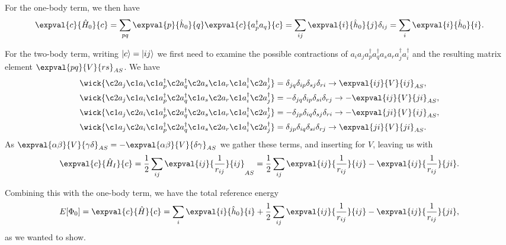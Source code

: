 For the one-body term, we then have
\begin{equation}
    \expval{c}{\hat{H}_0}{c} = \sum_{pq} \expval{p}{\hat{h}_0}{q} \expval{c}{a_p^\dagger a_q}{c} = \sum_{ij} \expval{i}{\hat{h}_0}{j} \delta_{ij} = \sum_{i} \expval{i}{\hat{h}_0}{i}.
\end{equation}

For the two-body term, writing $\lvert c\rangle = \lvert i j\rangle$ we first need to examine the possible contractions of $ a_i a_j a_p^\dagger a_q^\dagger a_s a_r a_j^\dagger a_i^\dagger$ and the resulting matrix element $\expval{pq}{V}{rs}_{AS}$.
We have
\begin{align*}
    \wick{
        \c2 a_j
        \c1 a_i
        \c1 a_p^\dagger
        \c2 a_q^\dagger
        \c2 a_s
        \c1 a_r
        \c1 a_i^\dagger
        \c2 a_j^\dagger
    } &= \delta_{jq} \delta_{ip} \delta_{sj} \delta_{ri} \to \expval{ij}{V}{ij}_{AS}, \\
    \wick{
        \c2 a_j
        \c1 a_i
        \c1 a_p^\dagger
        \c2 a_q^\dagger
        \c1 a_s
        \c2 a_r
        \c1 a_i^\dagger
        \c2 a_j^\dagger
    } &= -\delta_{jq} \delta_{ip} \delta_{si} \delta_{rj} \to -\expval{ij}{V}{ji}_{AS}, \\
    \wick{
        \c1 a_j
        \c2 a_i
        \c1 a_p^\dagger
        \c2 a_q^\dagger
        \c2 a_s
        \c1 a_r
        \c1 a_i^\dagger
        \c2 a_j^\dagger
    } &= -\delta_{jp} \delta_{iq} \delta_{sj} \delta_{ri} \to -\expval{ji}{V}{ij}_{AS}, \\
    \wick{
        \c1 a_j
        \c2 a_i
        \c1 a_p^\dagger
        \c2 a_q^\dagger
        \c1 a_s
        \c2 a_r
        \c1 a_i^\dagger
        \c2 a_j^\dagger
    } &= \delta_{jp} \delta_{iq} \delta_{si} \delta_{rj} \to \expval{ji}{V}{ji}_{AS}.
\end{align*}
As $\expval{\alpha \beta}{V}{\gamma \delta}_{AS} = - \expval{\alpha \beta}{V}{\delta \gamma}_{AS}$ we gather these terms, and inserting for $V$, leaving us with
\begin{equation}
    \expval{c}{\hat{H}_I}{c} = \frac{1}{2} \sum_{ij} \expval{ij}{\frac{1}{r_{ij}}}{ij}_{AS} = \frac{1}{2} \sum_{ij} \expval{ij}{\frac{1}{r_{ij}}}{ij} - \expval{ij}{\frac{1}{r_{ij}}}{ji}.
\end{equation}

Combining this with the one-body term, we have the total reference energy
\begin{equation}
    E[\Phi_0] = \expval{c}{\hat{H}}{c} = \sum_{i} \expval{i}{\hat{h}_0}{i} + \frac{1}{2} \sum_{ij} \expval{ij}{\frac{1}{r_{ij}}}{ij} - \expval{ij}{\frac{1}{r_{ij}}}{ji},
\end{equation}
as we wanted to show.

